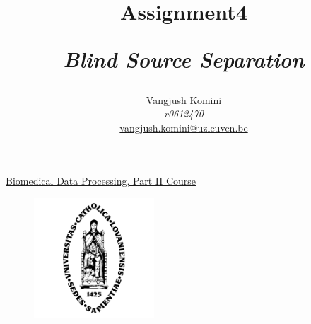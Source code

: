 \documentclass[a4paper]{article}
\title{Assignment4\\\centerline{\textit{Blind Source Separation}} }
\author{
\href{mailto:vangjush.komini@uzleuven.be}{Vangjush Komini}\\  \textit{r0612470} \\
\href{mailto:vangjush.komini@uzleuven.be}{vangjush.komini@uzleuven.be}\\
}
\numberwithin{equation}{subsection}
\numberwithin{figure}{subsection}
\begin{document}
\maketitle
\begin{center}
\Large \href{https://onderwijsaanbod.kuleuven.be/syllabi/e/H06W1AE.htm#activetab=doelstellingen_idp41200}{Biomedical Data Processing, Part II Course}
\end{center}

\begin{figure}[!htbp]
\centering
\includegraphics[width=0.4\textwidth]{icon2.png}
\end{figure}







\clearpage




\clearpage
\appendix




\end{document}
